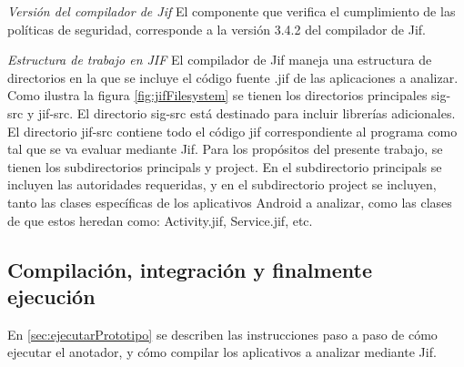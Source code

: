 \textit{Versión del compilador de Jif}\newline
El componente que verifica el cumplimiento de las políticas de seguridad,
corresponde a la versión 3.4.2 del compilador de Jif.

\textit{Estructura de trabajo en JIF}\newline
El compilador de Jif maneja una estructura de directorios en la que se incluye
el código fuente .jif de las aplicaciones a analizar. Como ilustra la figura
\ref{fig:jifFilesystem} se tienen los directorios principales sig-src y jif-src.
El directorio sig-src está destinado para incluir librerías adicionales.\newline 
El directorio jif-src contiene todo el código jif correspondiente al programa
como tal que se va evaluar mediante Jif. Para los propósitos del presente
trabajo, se tienen los subdirectorios principals y project. En el subdirectorio
principals se incluyen las autoridades requeridas, y en el subdirectorio
project se incluyen, tanto las clases específicas de los aplicativos Android a
analizar, como las clases de que estos heredan como: Activity.jif, Service.jif,
etc.

\subsection{Compilación, integración y finalmente ejecución }
En \ref{sec:ejecutarPrototipo} se describen las instrucciones paso a paso de cómo
ejecutar el anotador, y cómo compilar los aplicativos a analizar mediante Jif.





















